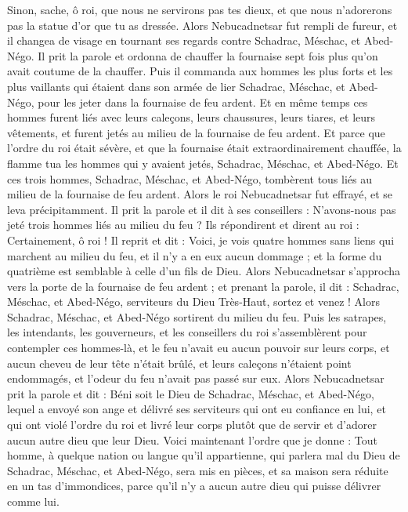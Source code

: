 \begin{multicols}{2}
Sinon, sache, ô roi, que nous ne servirons pas tes dieux, et que nous n'adorerons pas la statue d'or que tu as dressée.
Alors Nebucadnetsar fut rempli de fureur, et il changea de visage en tournant ses regards contre Schadrac, Méschac, et Abed-Négo. Il prit la parole et ordonna de chauffer la fournaise sept fois plus qu'on avait coutume de la chauffer.
Puis il commanda aux hommes les plus forts et les plus vaillants qui étaient dans son armée de lier Schadrac, Méschac, et Abed-Négo, pour les jeter dans la fournaise de feu ardent.
Et en même temps ces hommes furent liés avec leurs caleçons, leurs chaussures, leurs tiares, et leurs vêtements, et furent jetés au milieu de la fournaise de feu ardent.
Et parce que l'ordre du roi était sévère, et que la fournaise était extraordinairement chauffée, la flamme tua les hommes qui y avaient jetés, Schadrac, Méschac, et Abed-Négo.
Et ces trois hommes, Schadrac, Méschac, et Abed-Négo, tombèrent tous liés au milieu de la fournaise de feu ardent.
Alors le roi Nebucadnetsar fut effrayé, et se leva précipitamment. Il prit la parole et il dit à ses conseillers : N'avons-nous pas jeté trois hommes liés au milieu du feu ? Ils répondirent et dirent au roi : Certainement, ô roi !
Il reprit et dit : Voici, je vois quatre hommes sans liens qui marchent au milieu du feu, et il n'y a en eux aucun dommage ; et la forme du quatrième est semblable à celle d'un fils de Dieu.
Alors Nebucadnetsar s'approcha vers la porte de la fournaise de feu ardent ; et prenant la parole, il dit : Schadrac, Méschac, et Abed-Négo, serviteurs du Dieu Très-Haut, sortez et venez ! Alors Schadrac, Méschac, et Abed-Négo sortirent du milieu du feu.
Puis les satrapes, les intendants, les gouverneurs, et les conseillers du roi s'assemblèrent pour contempler ces hommes-là, et le feu n'avait eu aucun pouvoir sur leurs corps, et aucun cheveu de leur tête n'était brûlé, et leurs caleçons n'étaient point endommagés, et l'odeur du feu n'avait pas passé sur eux.
Alors Nebucadnetsar prit la parole et dit : Béni soit le Dieu de Schadrac, Méschac, et Abed-Négo, lequel a envoyé son ange et délivré ses serviteurs qui ont eu confiance en lui, et qui ont violé l'ordre du roi et livré leur corps plutôt que de servir et d'adorer aucun autre dieu que leur Dieu.
Voici maintenant l'ordre que je donne : Tout homme, à quelque nation ou langue qu'il appartienne, qui parlera mal du Dieu de Schadrac, Méschac, et Abed-Négo, sera mis en pièces, et sa maison sera réduite en un tas d'immondices, parce qu'il n'y a aucun autre dieu qui puisse délivrer comme lui.

\end{multicols}
